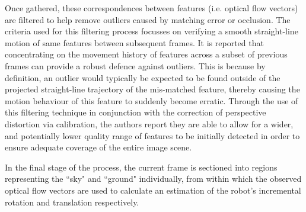 Once gathered, these correspondences between features (i.e. optical flow vectors) are filtered to help remove outliers caused by matching error or occlusion. The criteria used for this filtering process focusses on verifying a smooth straight-line motion of same features between subsequent frames. It is reported that concentrating on the movement history of features across a subset of previous frames can provide a robust defence against outliers. This is because by definition, an outlier would typically be expected to be found outside of the projected straight-line trajectory of the mis-matched feature, thereby causing the motion behaviour of this feature to suddenly become erratic. Through the use of this filtering technique in conjunction with the correction of perspective distortion via calibration, the authors report they are able to allow for a wider, and potentially lower quality range of features to be initially detected in order to ensure adequate coverage of the entire image scene. 

In the final stage of the process, the current frame is sectioned into regions representing the ``sky" and ``ground" individually, from within which the observed optical flow vectors are used to calculate an estimation of the robot's incremental rotation and translation respectively.


